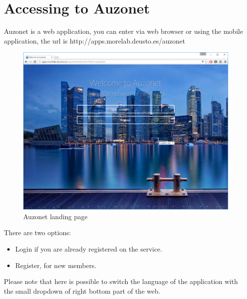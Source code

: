 \documentclass{DeustoFDP}
\begin{document}
\section{Accessing to Auzonet}
Auzonet is a web application, you can enter via web browser or using the mobile application, the url is http://apps.morelab.deusto.es/auzonet 
\begin{figure}[h!]
\centering
\includegraphics[width=0.9\linewidth]{"fig/Manual/landing"}
\caption[Auzonet landing page]{Auzonet landing page}
\label{fig:landing}
\end{figure}

There are two options:
\begin{itemize}
	\item Login if you are already registered on the service.
	\item Register, for new members.
\end{itemize}

Please note that here is possible to switch the language of the application with the small dropdown of right bottom part of the web.
\end{document}
